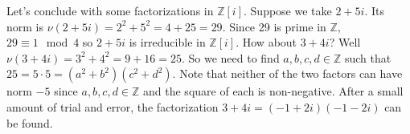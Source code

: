 \documentclass[11pt]{amsart}
\theoremstyle{definition}
\newcommand{\integers}{\mathbb{Z}}
\newcommand{\zi}{\mathbb{Z}[i]} %
\begin{document}
Let's conclude with some factorizations in $\zi$. Suppose we take $2 + 5i$. Its norm is $\nu(2 + 5i) = 2^2 + 5^2 = 4 + 25 = 29$. 
Since 29 is prime in $\integers$, $29 \equiv 1 \mod 4$ so $2 + 5i$ is irreducible in $\zi$. How about $3 + 4i$? Well 
$\nu(3 + 4i) = 3^2 + 4^2 = 9 + 16 = 25$. So we need to find $a, b, c, d \in \integers$ such that $25 = 5 \cdot 5 = (a^2 + b^2)(c^2 + d^2)$. Note
that neither of the two factors can have norm $-5$ since $a, b, c, d \in \integers$ and the square of each is non-negative. After a small amount of
trial and error, the factorization $3 + 4i = (-1 + 2i)(-1 - 2i)$ can be found.
\end{document}
